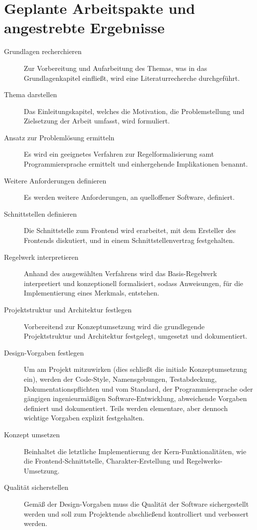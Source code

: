 \section{Geplante Arbeitspakte und angestrebte Ergebnisse}
\label{sec:geplante-arbeitspakte-und-angestrebte-ergebnisse}

\begin{description}
    \item[Grundlagen recherchieren] Zur Vorbereitung und Aufarbeitung des Themas, was \insb in das Grundlagenkapitel einfließt, wird eine Literaturrecherche durchgeführt.
    \item[Thema darstellen] Das Einleitungskapitel, welches die Motivation, die Problemstellung und Zielsetzung der Arbeit umfasst, wird formuliert.
    \item[Ansatz zur Problemlösung ermitteln] Es wird \uA ein geeignetes Verfahren zur Regelformalisierung samt Programmiersprache ermittelt und einhergehende Implikationen benannt.
    \item[Weitere Anforderungen definieren] Es werden weitere Anforderungen, \insb an quelloffener Software, definiert.
    \item[Schnittstellen definieren] Die Schnittstelle zum Frontend wird erarbeitet, \ggfs mit dem Ersteller des Frontends diskutiert, und in einem Schnittstellenvertrag festgehalten.
    \item[Regelwerk interpretieren] Anhand des ausgewählten Verfahrens wird das Basis-Regelwerk interpretiert und konzeptionell formalisiert, sodass Anweisungen, \zB für die Implementierung eines Merkmals, entstehen.
    \item[Projektstruktur und Architektur festlegen] Vorbereitend zur Konzeptumsetzung wird die grundlegende Projektstruktur und Architektur festgelegt, umgesetzt und dokumentiert.
    \item[Design-Vorgaben festlegen] Um am Projekt mitzuwirken (dies schließt die initiale Konzeptumsetzung ein), werden \uA der Code-Style, Namensgebungen, Testabdeckung, Dokumentationspflichten und \ggfs vom Standard, \zB der Programmiersprache oder gängigen ingenieurmäßigen Software-Entwicklung, abweichende Vorgaben definiert und dokumentiert.
    Teils werden elementare, aber dennoch wichtige Vorgaben explizit festgehalten.
    \item[Konzept umsetzen] Beinhaltet die letztliche Implementierung der Kern-Funktionalitäten, wie die Frontend-Schnittstelle, Charakter-Erstellung und Regelwerks-Umsetzung.
    \item[Qualität sicherstellen] Gemäß der Design-Vorgaben muss die Qualität der Software sichergestellt werden und soll zum Projektende abschließend kontrolliert und \ggfs verbessert werden.
\end{description}
